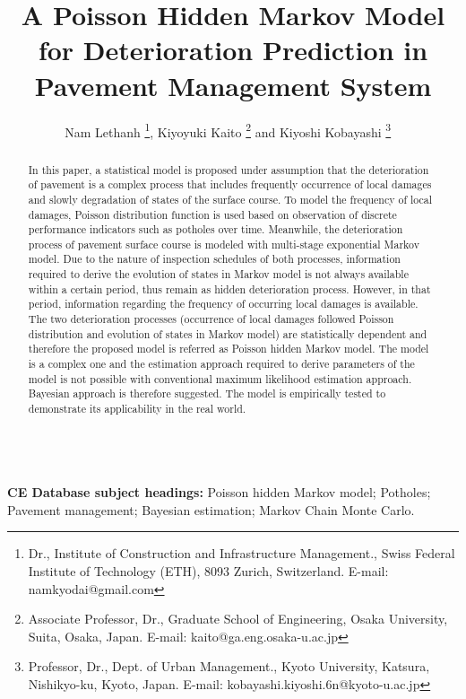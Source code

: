 \documentclass[Journal]{ascelike}
\begin{document}
%
\title{A Poisson Hidden Markov Model for Deterioration Prediction in Pavement Management System}
%
\author{Nam Lethanh \thanks{Dr., Institute of Construction and Infrastructure Management., Swiss Federal Institute of Technology (ETH), 8093 Zurich, Switzerland. E-mail: namkyodai@gmail.com}, Kiyoyuki Kaito \thanks{Associate Professor, Dr., Graduate School of Engineering, Osaka University, Suita, Osaka, Japan. \hspace{10mm}E-mail: kaito@ga.eng.osaka-u.ac.jp} and Kiyoshi Kobayashi%
\thanks{Professor, Dr., Dept. of Urban Management., Kyoto University, Katsura, Nishikyo-ku, Kyoto, Japan. \hspace{10mm}E-mail: kobayashi.kiyoshi.6n@kyoto-u.ac.jp}
\ %
%
}
%
\maketitle
%
\begin{abstract}
In this paper, a statistical model is proposed under assumption that the deterioration of pavement is a complex process that includes frequently occurrence of local damages and slowly degradation of states of the surface course. To model the frequency of local damages, Poisson distribution function is used based on observation of discrete performance indicators such as potholes over time. Meanwhile, the deterioration process of pavement surface course is modeled with multi-stage exponential Markov model. Due to the nature of inspection schedules of both processes, information required to derive the evolution of states in Markov model is not always available within a certain period, thus remain as hidden deterioration process. However, in that period, information regarding the frequency of occurring local damages is available. The two deterioration processes (occurrence of local damages followed Poisson distribution and evolution of states in Markov model) are statistically dependent and therefore the proposed model is referred as Poisson hidden Markov model. The model is a complex one and the estimation approach required to derive parameters of the model is not possible with conventional maximum likelihood estimation approach. Bayesian approach is therefore suggested. The model is empirically tested to demonstrate its applicability in the real world.
\end{abstract}
%
\\
\textbf{CE Database subject headings:} Poisson hidden Markov model; Potholes; Pavement management; Bayesian estimation; Markov Chain Monte Carlo.
\end{document}
